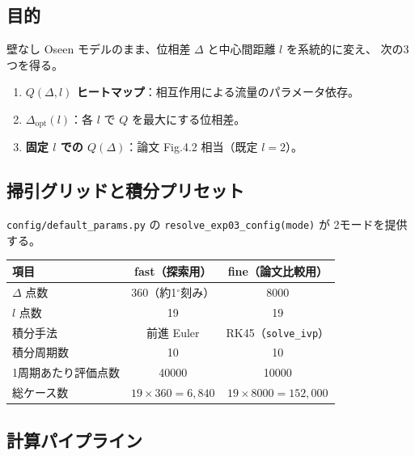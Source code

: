 \documentclass[11pt,a4paper]{article}
\newcommand{\Dopt}{\Delta_{\mathrm{opt}}}
\begin{document}
\subsection{目的}

壁なし Oseen モデルのまま、位相差 $\Delta$ と中心間距離 $l$ を系統的に変え、
次の3つを得る。

\begin{enumerate}
\item \textbf{$Q(\Delta,l)$ ヒートマップ}：相互作用による流量のパラメータ依存。
\item \textbf{$\Dopt(l)$}：各 $l$ で $Q$ を最大にする位相差。
\item \textbf{固定 $l$ での $Q(\Delta)$}：論文 Fig.4.2 相当（既定 $l=2$）。
\end{enumerate}

\subsection{掃引グリッドと積分プリセット}

\texttt{config/default\_params.py} の \texttt{resolve\_exp03\_config(mode)} が
2モードを提供する。

\begin{table}[h]
\centering\small
\begin{tabularx}{\linewidth}{X c c}
\toprule
項目 & fast（探索用） & fine（論文比較用） \\
\midrule
$\Delta$ 点数 & 360（約1$^\circ$刻み） & 8000 \\
$l$ 点数 & 19 & 19 \\
積分手法 & 前進 Euler & RK45（\texttt{solve\_ivp}） \\
積分周期数 & 10 & 10 \\
1周期あたり評価点数 & 40000 & 10000 \\
総ケース数 & $19\times360=6{,}840$ & $19\times8000=152{,}000$ \\
\bottomrule
\end{tabularx}
\end{table}

\subsection{計算パイプライン}
\end{document}
